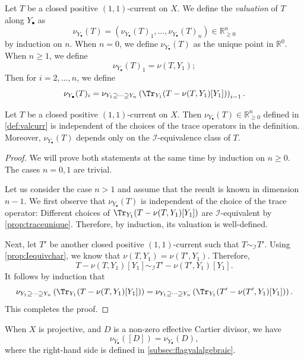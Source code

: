 \begin{definition}\label{def:valcurr}
    Let $T$ be a closed positive $(1,1)$-current on $X$. We define the \emph{valuation} of $T$ along $Y_{\bullet}$ as
    \[
        \nu_{Y_{\bullet}}(T)=\left(\nu_{Y_{\bullet}}(T)_1,\ldots,\nu_{Y_{\bullet}}(T)_n\right)\in \mathbb{R}_{\geq 0}^n
    \]
    by induction on $n$. When $n=0$, we define $\nu_{Y_{\bullet}}(T)$ as the unique point in $\mathbb{R}^0$. When $n\geq 1$, we define
    \[
        \nu_{Y_{\bullet}}(T)_1=\nu(T,Y_1);
    \]
    Then for $i=2,\ldots,n$, we define
    \[
        \nu_{Y_{\bullet}}(T)_i=\nu_{Y_1\supseteq \cdots \supseteq Y_n}\left(\Tr_{Y_1}(T-\nu(T,Y_1)[Y_1])\right)_{i-1}.
    \]
\end{definition}

\begin{proposition}\label{prop:valcurr_Iind}
    Let $T$ be a closed positive $(1,1)$-current on $X$. Then $\nu_{Y_{\bullet}}(T)\in \mathbb{R}_{\geq 0}^n$ defined in \cref{def:valcurr} is independent of the choices of the trace operators in the definition. Moreover, $\nu_{Y_{\bullet}}(T)$ depends only on the $\mathcal{I}$-equivalence class of $T$.
\end{proposition}
\begin{proof}
    We will prove both statements at the same time by induction on $n\geq 0$. The cases $n=0,1$ are trivial.

    Let us consider the case $n>1$ and assume that the result is known in dimension $n-1$.
    We first observe that $\nu_{Y_{\bullet}}(T)$ is independent of the choice of the trace operator: Different choices of $\Tr_{Y_1}(T-\nu(T,Y_1)[Y_1])$ are $\mathcal{I}$-equivalent by \cref{prop:traceunique}. Therefore, by induction, its valuation is well-defined.

    Next, let $T'$ be another closed positive $(1,1)$-current such that $T\sim_{\mathcal{I}}T'$.
    Using \cref{prop:Iequivchar}, we know that $\nu(T,Y_1)=\nu(T',Y_1)$. Therefore,
    \[
        T- \nu(T,Y_1)[Y_1]\sim_{\mathcal{I}} T'-\nu(T',Y_1)[Y_1].
    \]
    It follows by induction that
    \[
        \nu_{Y_1\supseteq \cdots \supseteq Y_n}\left(\Tr_{Y_1}(T-\nu(T,Y_1)[Y_1])\right)=\nu_{Y_1\supseteq \cdots \supseteq Y_n}\left(\Tr_{Y_1}(T'-\nu(T',Y_1)[Y_1])\right).
    \]
    This completes the proof.
\end{proof}

\begin{example}\label{ex:valuationdivcompatible}
    When $X$ is projective, and $D$ is a non-zero effective Cartier divisor, we have
    \[
    \nu_{Y_{\bullet}}([D])=\nu_{Y_{\bullet}}(D),
    \]
    where the right-hand side is defined in \cref{subsec:flagvalalgebraic}.
\end{example}

